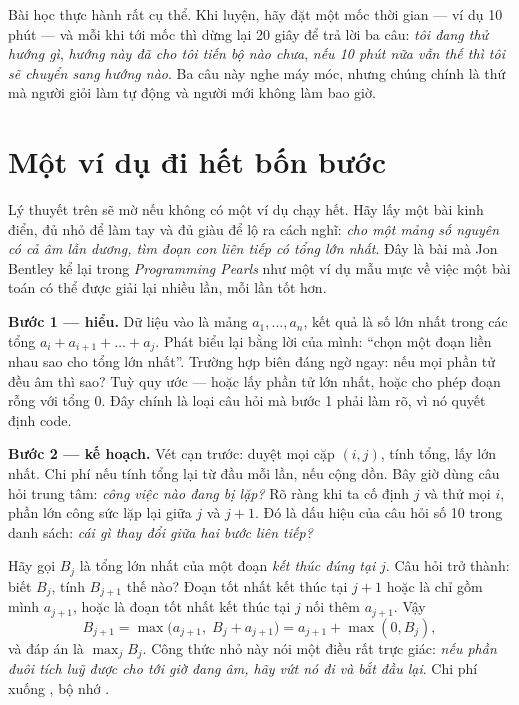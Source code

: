 \documentclass[../../algorithm.tex]{subfiles}
\begin{document}
Bài học thực hành rất cụ thể. Khi luyện, hãy đặt một mốc thời gian --- ví dụ 10 phút --- và mỗi khi tới mốc thì dừng lại 20 giây để trả lời ba câu: \emph{tôi đang thử hướng gì}, \emph{hướng này đã cho tôi tiến bộ nào chưa}, \emph{nếu 10 phút nữa vẫn thế thì tôi sẽ chuyển sang hướng nào}. Ba câu này nghe máy móc, nhưng chúng chính là thứ mà người giỏi làm tự động và người mới không làm bao giờ.

\section{Một ví dụ đi hết bốn bước}

Lý thuyết trên sẽ mờ nếu không có một ví dụ chạy hết. Hãy lấy một bài kinh điển, đủ nhỏ để làm tay và đủ giàu để lộ ra cách nghĩ: \emph{cho một mảng số nguyên có cả âm lẫn dương, tìm đoạn con liên tiếp có tổng lớn nhất}. Đây là bài mà Jon Bentley kể lại trong \emph{Programming Pearls}\cite{bentley2000} như một ví dụ mẫu mực về việc một bài toán có thể được giải lại nhiều lần, mỗi lần tốt hơn.

\textbf{Bước 1 --- hiểu.} Dữ liệu vào là mảng \(a_1,\dots,a_n\), kết quả là số lớn nhất trong các tổng \(a_i + a_{i+1} + \dots + a_j\). Phát biểu lại bằng lời của mình: ``chọn một đoạn liền nhau sao cho tổng lớn nhất''. Trường hợp biên đáng ngờ ngay: nếu mọi phần tử đều âm thì sao? Tuỳ quy ước --- hoặc lấy phần tử lớn nhất, hoặc cho phép đoạn rỗng với tổng 0. Đây chính là loại câu hỏi mà bước 1 phải làm rõ, vì nó quyết định code.

\textbf{Bước 2 --- kế hoạch.} Vét cạn trước: duyệt mọi cặp \((i,j)\), tính tổng, lấy lớn nhất. Chi phí  nếu tính tổng lại từ đầu mỗi lần,  nếu cộng dồn. Bây giờ dùng câu hỏi trung tâm: \emph{công việc nào đang bị lặp?} Rõ ràng khi ta cố định \(j\) và thử mọi \(i\), phần lớn công sức lặp lại giữa \(j\) và \(j+1\). Đó là dấu hiệu của câu hỏi số 10 trong danh sách: \emph{cái gì thay đổi giữa hai bước liên tiếp?}

Hãy gọi \(B_j\) là tổng lớn nhất của một đoạn \emph{kết thúc đúng tại} \(j\). Câu hỏi trở thành: biết \(B_j\), tính \(B_{j+1}\) thế nào? Đoạn tốt nhất kết thúc tại \(j+1\) hoặc là chỉ gồm mình \(a_{j+1}\), hoặc là đoạn tốt nhất kết thúc tại \(j\) nối thêm \(a_{j+1}\). Vậy
\[
B_{j+1} = \max\bigl(a_{j+1},\; B_j + a_{j+1}\bigr) = a_{j+1} + \max(0, B_j),
\]
và đáp án là \(\max_j B_j\). Công thức nhỏ này nói một điều rất trực giác: \emph{nếu phần đuôi tích luỹ được cho tới giờ đang âm, hãy vứt nó đi và bắt đầu lại}. Chi phí xuống , bộ nhớ .
\end{document}
